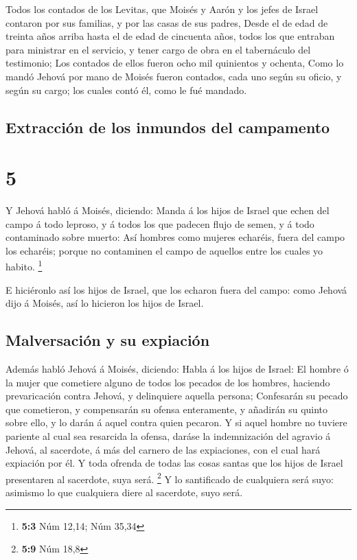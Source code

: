  Todos los contados de los Levitas, que Moisés y Aarón y
los jefes de Israel contaron por sus familias, y por las casas de sus
padres,  Desde el de edad de treinta años arriba hasta el
de edad de cincuenta años, todos los que entraban para ministrar en el
servicio, y tener cargo de obra en el tabernáculo del testimonio;
 Los contados de ellos fueron ocho mil quinientos y
ochenta,  Como lo mandó Jehová por mano de Moisés fueron
contados, cada uno según su oficio, y según su cargo; los cuales contó
él, como le fué mandado.

\hypertarget{extracciuxf3n-de-los-inmundos-del-campamento}{%
\subsection{Extracción de los inmundos del
campamento}\label{extracciuxf3n-de-los-inmundos-del-campamento}}

\hypertarget{section-4}{%
\section{5}\label{section-4}}

 Y Jehová habló á Moisés, diciendo:  Manda á
los hijos de Israel que echen del campo á todo leproso, y á todos los
que padecen flujo de semen, y á todo contaminado sobre muerto:
 Así hombres como mujeres echaréis, fuera del campo los
echaréis; porque no contaminen el campo de aquellos entre los cuales yo
habito. \footnote{\textbf{5:3} Núm 12,14; Núm 35,34}

 E hiciéronlo así los hijos de Israel, que los echaron
fuera del campo: como Jehová dijo á Moisés, así lo hicieron los hijos de
Israel.

\hypertarget{malversaciuxf3n-y-su-expiaciuxf3n}{%
\subsection{Malversación y su
expiación}\label{malversaciuxf3n-y-su-expiaciuxf3n}}

 Además habló Jehová á Moisés, diciendo: 
Habla á los hijos de Israel: El hombre ó la mujer que cometiere alguno
de todos los pecados de los hombres, haciendo prevaricación contra
Jehová, y delinquiere aquella persona;  Confesarán su
pecado que cometieron, y compensarán su ofensa enteramente, y añadirán
su quinto sobre ello, y lo darán á aquel contra quien pecaron.
 Y si aquel hombre no tuviere pariente al cual sea
resarcida la ofensa, daráse la indemnización del agravio á Jehová, al
sacerdote, á más del carnero de las expiaciones, con el cual hará
expiación por él.  Y toda ofrenda de todas las cosas
santas que los hijos de Israel presentaren al sacerdote, suya será.
\footnote{\textbf{5:9} Núm 18,8}  Y lo santificado de
cualquiera será suyo: asimismo lo que cualquiera diere al sacerdote,
suyo será.

